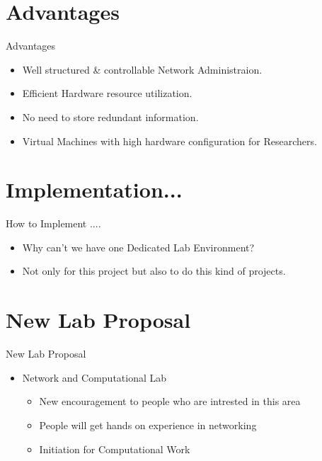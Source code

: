 \documentclass[xcolor=dvipsnames]{beamer}
\begin{document}
\section{Advantages}
\begin{frame}{Advantages}
\begin{itemize}
	\item Well structured \& controllable Network Administraion.
	\item Efficient Hardware resource utilization.
	\item No need to store redundant information.
	\item Virtual Machines with high hardware configuration for Researchers.
\end{itemize}
\end{frame}

\section{Implementation...}
\begin{frame}{How to Implement ....}
\begin{itemize}
	\item Why can't we have one Dedicated Lab Environment?
	\item Not only for this project but also to do this kind of projects.
	
\end{itemize}
\end{frame}

\section{New Lab Proposal }
\begin{frame}{New Lab Proposal }
\begin{itemize}
	\item Network and Computational Lab
		\begin{itemize}
			\item New encouragement to people who are intrested in this area 
			\item People will get hands on experience in networking
			\item Initiation for Computational Work
		\end{itemize}
\end{itemize}
\end{frame}
\end{document}
